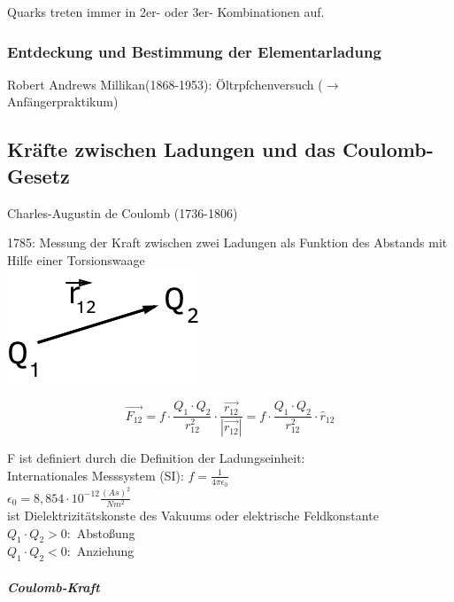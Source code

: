 \documentclass[11pt]{article}
\begin{document}
Quarks treten immer in 2er- oder 3er- Kombinationen auf.
\\

\subsubsection{Entdeckung und Bestimmung der Elementarladung}

Robert Andrews Millikan(1868-1953): Öltrpfchenversuch ($\rightarrow$ Anf\"{a}ngerpraktikum)


\subsection{Kr\"{a}fte zwischen Ladungen und das Coulomb-Gesetz} 

Charles-Augustin de Coulomb (1736-1806)

1785: Messung der Kraft zwischen zwei Ladungen als Funktion des Abstands mit Hilfe einer Torsionswaage \hfill \\

\includegraphics{skizzen/14/14_2B0}

$$ \boxed{\vec{F_{12}} = f\cdot\frac{Q_1\cdot Q_2}{r^2_{12}}\cdot\frac{\vec{r_{12}}}{|\vec{r_{12}}|} = f\cdot\frac{Q_1\cdot Q_2}{r^2_{12}}\cdot \hat{r}_{12}} $$

\noindent F ist definiert durch die Definition der Ladungseinheit:
\\
Internationales Messsystem (SI): $f=\frac{1}{4\pi\epsilon_0}$
\\
$\epsilon_0=8,854\cdot10^{-12}\frac{(As)^2}{Nm^2}$
\\
ist Dielektrizit\"{a}tskonste des Vakuums oder elektrische Feldkonstante
\\
$Q_1\cdot Q_2 > 0:$ Absto\ss{}ung
\\
$Q_1\cdot Q_2 < 0:$ Anziehung
\\
\subparagraph{Coulomb-Kraft}

\hfill\\

\end{document}
